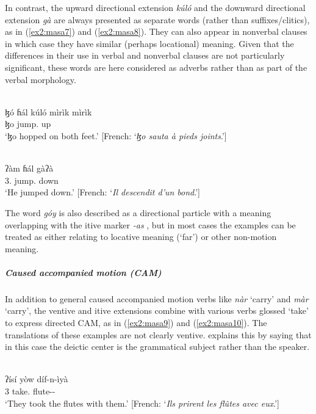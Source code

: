 In contrast, the upward directional extension \textit{kúló} and the downward directional extension \textit{gà} are always presented as separate words (rather than suffixes/clitics), as in (\ref{ex2:masa7}) and (\ref{ex2:masa8}). They can also appear in nonverbal clauses in which case they have similar (perhaps locational) meaning. Given that the differences in their use in verbal and nonverbal clauses are not particularly significant, these words are here considered as adverbs rather than as part of the verbal morphology.

\ea\label{ex2:masa7}
 \\
\gll ɮó ɦál kúló mìrìk mìrìk 	\\
ɮo jump. up 	\\
\glt `ɮo hopped on both feet.' [French: `\textit{ɮo sauta à pieds joints}.']

\ex\label{ex2:masa8}
 \\
\gll  ʔàm ɦál gàʔà	 \\
3. jump. down	\\
\glt `He jumped down.' [French: `\textit{Il descendit d’un bond}.']
\z 

The word \textit{góy} is also described as a directional particle with a meaning overlapping with the itive marker \textit{-as} \citep[223]{melisDescriptionMasaTchad1999}, but in most cases the examples can be treated as either relating to locative meaning (`far') or other non-motion meaning.

\subparagraph{Caused accompanied motion (CAM)}

In addition to general caused accompanied motion verbs like \textit{nàr} `carry' and \textit{màr} `carry', the ventive and itive extensions combine with various verbs glossed `take' to express directed CAM, as in (\ref{ex2:masa9}) and (\ref{ex2:masa10}). The translations of these examples are not clearly ventive. \citet[216]{melisDescriptionMasaTchad1999} explains this by saying that in this case the deictic center is the grammatical subject rather than the speaker. 

\ea\label{ex2:masa9}
 \\
\gll ʔísí yòw díf-n-ìyà	\\
3 take. flute--	\\
\glt `They took the flutes with them.' [French: `\textit{Ils prirent les flûtes avec eux}.']

